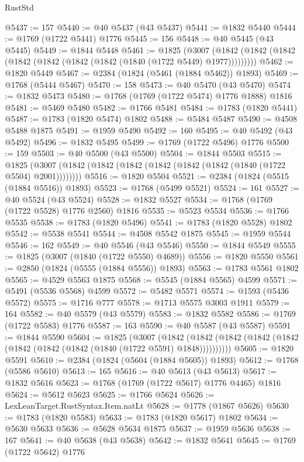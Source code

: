 \begin{lexlean}{RustStd}
\begin{coremodule}
@5437 := 157
@5440 := @40 @5437 (@43 @5437)
@5441 := @1832 @5440
@5444 := @1769 (@1722 @5441) @1776
@5445 := 156
@5448 := @40 @5445 (@43 @5445)
@5449 := @1844 @5448
@5461 := @1825
    (@3007 (@1842 (@1842 (@1842 (@1842 (@1842 (@1842 (@1842 (@1840 (@1722 @5449) @1977)))))))))
@5462 := @1820 @5449
@5467 := @2384 (@1824 (@5461 (@1884 @5462)) @1893)
@5469 := @1768 (@5444 @5467)
@5470 := 158
@5473 := @40 @5470 (@43 @5470)
@5474 := @1832 @5473
@5480 := @1768 (@1769 (@1722 @5474) @1776 @1888) @1816
@5481 := @5469 @5480
@5482 := @1766 @5481
@5484 := @1783 (@1820 @5441)
@5487 := @1783 (@1820 @5474) @1802
@5488 := @5484 @5487
@5490 := @4508 @5488 @1875
@5491 := @1959 @5490
@5492 := 160
@5495 := @40 @5492 (@43 @5492)
@5496 := @1832 @5495
@5499 := @1769 (@1722 @5496) @1776
@5500 := 159
@5503 := @40 @5500 (@43 @5500)
@5504 := @1844 @5503
@5515 := @1825 (@3007 (@1842 (@1842 (@1842 (@1842 (@1842 (@1842 (@1840 (@1722 @5504) @2001))))))))
@5516 := @1820 @5504
@5521 := @2384 (@1824 (@5515 (@1884 @5516)) @1893)
@5523 := @1768 (@5499 @5521)
@5524 := 161
@5527 := @40 @5524 (@43 @5524)
@5528 := @1832 @5527
@5534 := @1768 (@1769 (@1722 @5528) @1776 @2560) @1816
@5535 := @5523 @5534
@5536 := @1766 @5535
@5538 := @1783 (@1820 @5496)
@5541 := @1783 (@1820 @5528) @1802
@5542 := @5538 @5541
@5544 := @4508 @5542 @1875
@5545 := @1959 @5544
@5546 := 162
@5549 := @40 @5546 (@43 @5546)
@5550 := @1844 @5549
@5555 := @1825 (@3007 (@1840 (@1722 @5550) @4689))
@5556 := @1820 @5550
@5561 := @2850 (@1824 (@5555 (@1884 @5556)) @1893)
@5563 := @1783 @5561 @1802
@5565 := @4529 @5563 @1875
@5568 := @5545 (@1884 @5565) @4599
@5571 := @5491 (@5536 @5568) @4599
@5572 := @5482 @5571
@5574 := @1593 (@5436 @5572)
@5575 := @1716 @777
@5578 := @1713 @5575 @3003 @1911
@5579 := 164
@5582 := @40 @5579 (@43 @5579)
@5583 := @1832 @5582
@5586 := @1769 (@1722 @5583) @1776
@5587 := 163
@5590 := @40 @5587 (@43 @5587)
@5591 := @1844 @5590
@5604 := @1825
    (@3007
      (@1842 (@1842 (@1842 (@1842 (@1842 (@1842 (@1842 (@1842 (@1840 (@1722 @5591) @1848))))))))))
@5605 := @1820 @5591
@5610 := @2384 (@1824 (@5604 (@1884 @5605)) @1893)
@5612 := @1768 (@5586 @5610)
@5613 := 165
@5616 := @40 @5613 (@43 @5613)
@5617 := @1832 @5616
@5623 := @1768 (@1769 (@1722 @5617) @1776 @4465) @1816
@5624 := @5612 @5623
@5625 := @1766 @5624
@5626 := LexLeanTarget.RustSyntax.Item.natLt
@5628 := @1778 (@1867 @5626)
@5630 := @1783 (@1820 @5583)
@5633 := @1783 (@1820 @5617) @1802
@5634 := @5630 @5633
@5636 := @5628 @5634 @1875
@5637 := @1959 @5636
@5638 := 167
@5641 := @40 @5638 (@43 @5638)
@5642 := @1832 @5641
@5645 := @1769 (@1722 @5642) @1776

\end{coremodule}
\end{lexlean}
